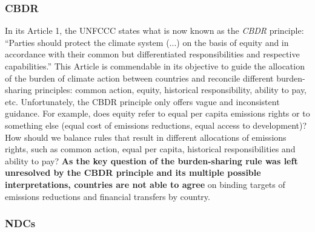 \documentclass[12pt,english]{article}
\begin{document}
\subsubsection{CBDR\label{subsubsec:cbdr}} 
In its Article 1, the UNFCCC states what is now known as the \textit{CBDR} principle: ``Parties should protect the climate system (...) on the basis of equity and in accordance with their common but differentiated responsibilities and respective capabilities.'' This Article is commendable in its objective to guide the allocation of the burden of climate action between countries and reconcile different burden-sharing principles: common action, equity, historical responsibility, ability to pay, etc. Unfortunately, the CBDR principle only offers vague and inconsistent guidance. For example, does equity refer to equal per capita emissions rights or to something else (equal cost of emissions reductions, equal access to development)? How should we balance rules that result in different allocations of emissions rights, such as common action, equal per capita, historical responsibilities and ability to pay? \textbf{As the key question of the burden-sharing rule was left unresolved by the CBDR principle and its multiple possible interpretations, countries are not able to agree} on binding targets of emissions reductions and financial transfers by country. 

\subsubsection{NDCs\label{subsubsec:ndc}} 
\end{document}
